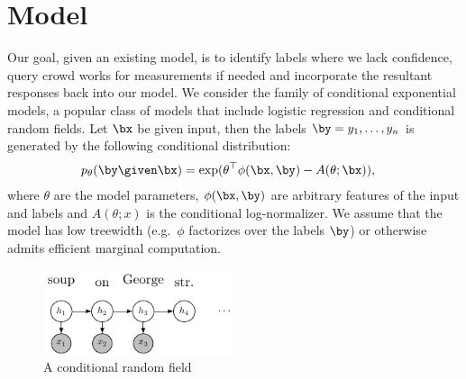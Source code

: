\section{Model}
\label{sec:model}


Our goal, given an existing model, is to identify labels where we lack confidence, query crowd works for measurements if needed and incorporate the resultant responses back into our model.
We consider the family of conditional exponential models, a popular class of models that include logistic regression and conditional random fields.
Let $\bx$ be given input, then the labels $\by = y_1, \ldots, y_n$ is generated by the following conditional distribution:
\begin{align*}
  \p(\by \given \bx) 
  &= \exp( \theta^\top \phi(\bx, \by) - A(\theta; \bx)),
\end{align*}
where $\theta$ are the model parameters, $\phi(\bx, \by)$ are arbitrary features of the input and labels and $A(\theta; x)$ is the conditional log-normalizer.
We assume that the model has low treewidth (e.g.\ $\phi$ factorizes over the labels $\by$) or otherwise admits efficient marginal computation.

\begin{figure}[t]
  \begin{centering}
  \includegraphics[width=0.5\textwidth]{figures/simple-crf.pdf}
  \end{centering}
  \caption{A conditional random field }
  \label{fig:crf}
\end{figure}

